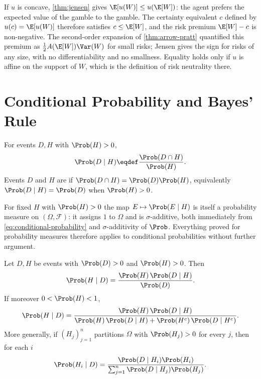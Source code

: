 \begin{eg}\label{eg:jensen-risk}
	If $u$ is concave, \autoref{thm:jensen} gives
	$\E[u(W)]\leq u(\E[W])$: the agent prefers the expected value of the gamble to
	the gamble. The certainty equivalent $c$ defined by $u(c)=\E[u(W)]$ therefore
	satisfies $c\leq\E[W]$, and the risk premium $\E[W]-c$ is non-negative. The
	second-order expansion of \autoref{thm:arrow-pratt} quantified this premium as
	$\tfrac12A(\E[W])\Var(W)$ for small risks; Jensen gives the sign for risks of
	any size, with no differentiability and no smallness. Equality holds only if $u$
	is affine on the support of $W$, which is the definition of risk neutrality
	there.
\end{eg}

\section{Conditional Probability and Bayes' Rule}\label{sec:prob-bayes}

\begin{definition}\label{def:conditional-probability}
	For events $D,H$ with $\Prob(H)>0$,
	\begin{equation}\label{eq:conditional-probability}
		\Prob(D\mid H)\eqdef\frac{\Prob(D\cap H)}{\Prob(H)} .
	\end{equation}
	Events $D$ and $H$ are  if
	$\Prob(D\cap H)=\Prob(D)\Prob(H)$, equivalently
	$\Prob(D\mid H)=\Prob(D)$ when $\Prob(H)>0$.
\end{definition}

For fixed $H$ with $\Prob(H)>0$ the map $E\mapsto\Prob(E\mid H)$ is itself a
probability measure on $(\Omega,\mathcal{F})$: it assigns $1$ to $\Omega$ and is
$\sigma$-additive, both immediately from \eqref{eq:conditional-probability} and
$\sigma$-additivity of $\Prob$. Everything proved for probability measures
therefore applies to conditional probabilities without further argument.

\begin{theorem}\label{thm:bayes}
	Let $D,H$ be events with $\Prob(D)>0$ and $\Prob(H)>0$. Then
	\begin{equation}\label{eq:bayes-1}
		\Prob(H\mid D)=\frac{\Prob(H)\,\Prob(D\mid H)}{\Prob(D)} .
	\end{equation}
	If moreover $0<\Prob(H)<1$,
	\begin{equation}\label{eq:bayes-2}
		\Prob(H\mid D)
		=\frac{\Prob(H)\,\Prob(D\mid H)}
		{\Prob(H)\,\Prob(D\mid H)+\Prob(H^{c})\,\Prob(D\mid H^{c})} .
	\end{equation}
	More generally, if $(H_j)_{j=1}^{n}$ partitions $\Omega$ with $\Prob(H_j)>0$ for
	every $j$, then for each $i$
	\begin{equation}\label{eq:bayes-partition}
		\Prob(H_i\mid D)
		=\frac{\Prob(D\mid H_i)\Prob(H_i)}
		{\sum_{j=1}^{n}\Prob(D\mid H_j)\Prob(H_j)} .
	\end{equation}
\end{theorem}

